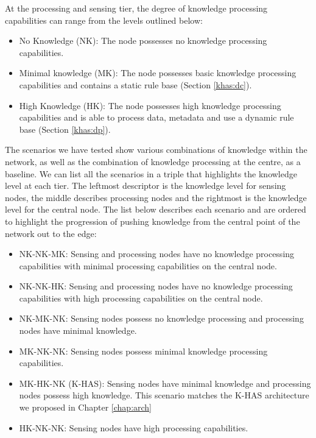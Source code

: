At the processing and sensing tier, the degree of knowledge processing capabilities can range from the levels outlined below:

	\begin{itemize}
		\item No Knowledge (NK): The node possesses no knowledge processing capabilities.
		\item Minimal knowledge (MK): The node possesses basic knowledge processing capabilities and contains a static rule base (Section \ref{khas:dc}).
		\item High Knowledge (HK): The node possesses high knowledge processing capabilities and is able to process data, metadata and use a dynamic rule base (Section \ref{khas:dp}).
	\end{itemize}

The scenarios we have tested show various combinations of knowledge within the network, as well as the combination of knowledge processing at the centre, as a baseline. We can list all the scenarios in a triple that highlights the knowledge level at each tier. The leftmost descriptor is the knowledge level for sensing nodes, the middle describes processing nodes and the rightmost is the knowledge level for the central node. The list below describes each scenario and are ordered to highlight the progression of pushing knowledge from the central point of the network out to the edge:

	\begin{itemize}
		\item NK-NK-MK: Sensing and processing nodes have no knowledge processing capabilities with minimal processing capabilities on the central node.
		\item NK-NK-HK: Sensing and processing nodes have no knowledge processing capabilities with high processing capabilities on the central node.
		\item NK-MK-NK: Sensing nodes possess no knowledge processing and processing nodes have minimal knowledge.
		\item MK-NK-NK: Sensing nodes possess minimal knowledge processing capabilities.
		\item MK-HK-NK (K-HAS): Sensing nodes have minimal knowledge and processing nodes possess high knowledge. This scenario matches the K-HAS architecture we proposed in Chapter \ref{chap:arch}
		\item HK-NK-NK: Sensing nodes have high processing capabilities.	
	\end{itemize}

